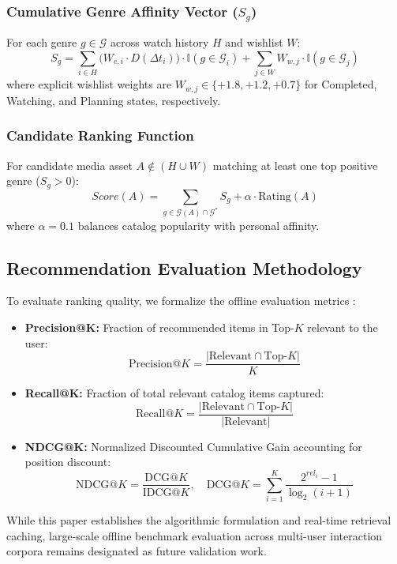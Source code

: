 \documentclass[conference]{IEEEtran}
\begin{document}
\subsubsection{Cumulative Genre Affinity Vector ($S_g$)}
For each genre $g \in \mathcal{G}$ across watch history $H$ and wishlist $W$:
\begin{equation}
S_g = \sum_{i \in H} \big(W_{e, i} \cdot D(\Delta t_i)\big) \cdot \mathbb{I}(g \in \mathcal{G}_i) + \sum_{j \in W} W_{w, j} \cdot \mathbb{I}(g \in \mathcal{G}_j)
\label{eq:affinity}
\end{equation}
where explicit wishlist weights are $W_{w, j} \in \{+1.8, +1.2, +0.7\}$ for Completed, Watching, and Planning states, respectively.

\subsubsection{Candidate Ranking Function}
For candidate media asset $A \notin (H \cup W)$ matching at least one top positive genre ($S_g > 0$):
\begin{equation}
Score(A) = \sum_{g \in \mathcal{G}(A) \cap \mathcal{G}^*} S_g + \alpha \cdot \text{Rating}(A)
\label{eq:candidate}
\end{equation}
where $\alpha = 0.1$ balances catalog popularity with personal affinity.

\subsection{Recommendation Evaluation Methodology}
To evaluate ranking quality, we formalize the offline evaluation metrics \cite{b6}:
\begin{itemize}
    \item \textbf{Precision@K:} Fraction of recommended items in Top-$K$ relevant to the user:
    \begin{equation}
    \text{Precision}@K = \frac{|\text{Relevant} \cap \text{Top-}K|}{K}
    \end{equation}
    \item \textbf{Recall@K:} Fraction of total relevant catalog items captured:
    \begin{equation}
    \text{Recall}@K = \frac{|\text{Relevant} \cap \text{Top-}K|}{|\text{Relevant}|}
    \end{equation}
    \item \textbf{NDCG@K:} Normalized Discounted Cumulative Gain accounting for position discount:
    \begin{equation}
    \text{NDCG}@K = \frac{\text{DCG}@K}{\text{IDCG}@K}, \quad \text{DCG}@K = \sum_{i=1}^K \frac{2^{rel_i} - 1}{\log_2(i + 1)}
    \end{equation}
\end{itemize}
While this paper establishes the algorithmic formulation and real-time retrieval caching, large-scale offline benchmark evaluation across multi-user interaction corpora remains designated as future validation work.
\end{document}
